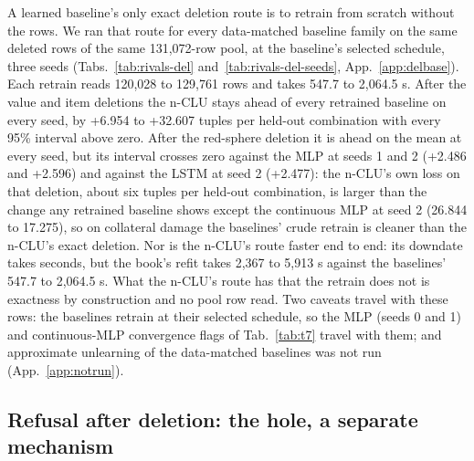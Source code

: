 \documentclass{article} %
\begin{document}
A learned baseline's only exact deletion route is to retrain from scratch without the rows. We ran
that route for every data-matched baseline family on the same deleted rows of the same 131,072-row %
pool, at the baseline's selected schedule, three seeds (Tabs.~\ref{tab:rivals-del}
and~\ref{tab:rivals-del-seeds}, App.~\ref{app:delbase}). Each retrain reads 120,028 to 129,761 %
rows and takes 547.7 to 2,064.5 s. After the value and item deletions the n-CLU stays ahead of every %
retrained baseline on every seed, by +6.954 to +32.607 tuples per held-out combination with every 95\% interval above %
zero. After the red-sphere deletion it is ahead on the mean at every seed, but its interval crosses
zero against the MLP at seeds 1 and 2 (+2.486 and +2.596) and against the LSTM at seed 2 %
(+2.477): the n-CLU's own loss on that deletion, about six tuples per held-out combination, is larger than the %
change any retrained baseline shows except the continuous MLP at seed 2 (26.844 to 17.275), so on %
collateral damage the baselines' crude retrain is cleaner than the n-CLU's exact deletion. Nor is the
n-CLU's route faster end to end: its downdate takes seconds, but the book's refit takes 2,367 to %
5,913 s against the baselines' 547.7 to 2,064.5 s. What the n-CLU's route has that the retrain does not %
is exactness by construction and no pool row read. Two caveats travel with these rows: the baselines
retrain at their selected schedule, so the MLP (seeds 0 and 1) and continuous-MLP convergence flags
of Tab.~\ref{tab:t7} travel with them; and approximate unlearning of the data-matched baselines was not
run (App.~\ref{app:notrun}).

\subsection{Refusal after deletion: the hole, a separate mechanism}
\label{sec:hole}
\end{document}
